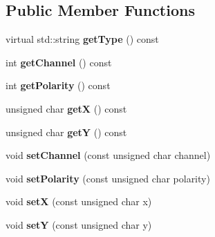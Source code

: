 \subsection*{Public Member Functions}
\begin{DoxyCompactItemize}
\item 
\hypertarget{classemorph_1_1AddressEvent_a9c414ce7baa55a47b12cfe3ef1868526}{virtual std\-::string {\bfseries get\-Type} () const }\label{classemorph_1_1AddressEvent_a9c414ce7baa55a47b12cfe3ef1868526}

\item 
\hypertarget{classemorph_1_1AddressEvent_a231fb70889293b3d4b875bbd56af34a0}{int {\bfseries get\-Channel} () const }\label{classemorph_1_1AddressEvent_a231fb70889293b3d4b875bbd56af34a0}

\item 
\hypertarget{classemorph_1_1AddressEvent_a0e84ab5bf9533555c3950c0121d5ede2}{int {\bfseries get\-Polarity} () const }\label{classemorph_1_1AddressEvent_a0e84ab5bf9533555c3950c0121d5ede2}

\item 
\hypertarget{classemorph_1_1AddressEvent_a9cb757a57b7636d3df4e97be81fb9ce1}{unsigned char {\bfseries get\-X} () const }\label{classemorph_1_1AddressEvent_a9cb757a57b7636d3df4e97be81fb9ce1}

\item 
\hypertarget{classemorph_1_1AddressEvent_a45a4341c3664f57f400816a37d3b9d61}{unsigned char {\bfseries get\-Y} () const }\label{classemorph_1_1AddressEvent_a45a4341c3664f57f400816a37d3b9d61}

\item 
\hypertarget{classemorph_1_1AddressEvent_a6f824e27c0ad466672a50dc32c757f22}{void {\bfseries set\-Channel} (const unsigned char channel)}\label{classemorph_1_1AddressEvent_a6f824e27c0ad466672a50dc32c757f22}

\item 
\hypertarget{classemorph_1_1AddressEvent_ada20d447ba331f85c1960b82c5e0b914}{void {\bfseries set\-Polarity} (const unsigned char polarity)}\label{classemorph_1_1AddressEvent_ada20d447ba331f85c1960b82c5e0b914}

\item 
\hypertarget{classemorph_1_1AddressEvent_a95b9eb0cb8fa36f8eda38843d64d6208}{void {\bfseries set\-X} (const unsigned char x)}\label{classemorph_1_1AddressEvent_a95b9eb0cb8fa36f8eda38843d64d6208}

\item 
\hypertarget{classemorph_1_1AddressEvent_a7044b37fd43e276051478d33399f6c24}{void {\bfseries set\-Y} (const unsigned char y)}\label{classemorph_1_1AddressEvent_a7044b37fd43e276051478d33399f6c24}


\end{DoxyCompactItemize}
